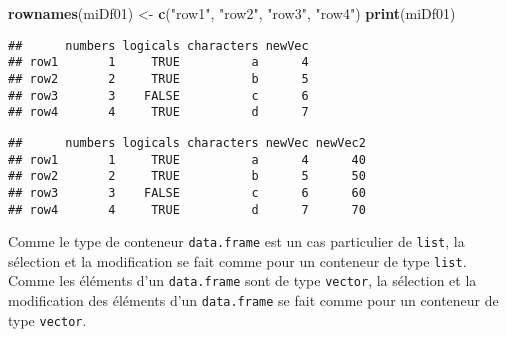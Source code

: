\documentclass[]{book}
\newenvironment{Shaded}{\begin{snugshade}}{\end{snugshade}}
\newcommand{\KeywordTok}[1]{\textcolor[rgb]{0.13,0.29,0.53}{\textbf{#1}}}
\newcommand{\DecValTok}[1]{\textcolor[rgb]{0.00,0.00,0.81}{#1}}
\newcommand{\StringTok}[1]{\textcolor[rgb]{0.31,0.60,0.02}{#1}}
\newcommand{\OperatorTok}[1]{\textcolor[rgb]{0.81,0.36,0.00}{\textbf{#1}}}
\newcommand{\NormalTok}[1]{#1}
\theoremstyle{definition}
\theoremstyle{definition}
\theoremstyle{definition}
\theoremstyle{remark}
\begin{document}
\begin{Shaded}
\begin{Highlighting}[]
\KeywordTok{rownames}\NormalTok{(miDf01) <-}\StringTok{ }\KeywordTok{c}\NormalTok{(}\StringTok{"row1"}\NormalTok{, }\StringTok{"row2"}\NormalTok{, }\StringTok{"row3"}\NormalTok{, }\StringTok{"row4"}\NormalTok{)}
\KeywordTok{print}\NormalTok{(miDf01)}
\end{Highlighting}
\end{Shaded}

\begin{verbatim}
##      numbers logicals characters newVec
## row1       1     TRUE          a      4
## row2       2     TRUE          b      5
## row3       3    FALSE          c      6
## row4       4     TRUE          d      7
\end{verbatim}

\begin{Shaded}
\end{Shaded}

\begin{verbatim}
##      numbers logicals characters newVec newVec2
## row1       1     TRUE          a      4      40
## row2       2     TRUE          b      5      50
## row3       3    FALSE          c      6      60
## row4       4     TRUE          d      7      70
\end{verbatim}

Comme le type de conteneur \texttt{data.frame} est un cas particulier de
\texttt{list}, la sélection et la modification se fait comme pour un
conteneur de type \texttt{list}. Comme les éléments d'un
\texttt{data.frame} sont de type \texttt{vector}, la sélection et la
modification des éléments d'un \texttt{data.frame} se fait comme pour un
conteneur de type \texttt{vector}.

\begin{Shaded}
\end{Shaded}
\end{document}
